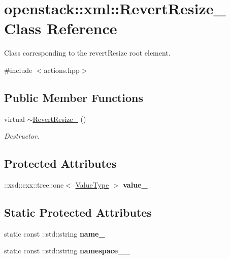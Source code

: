 \hypertarget{classopenstack_1_1xml_1_1RevertResize__}{
\section{openstack::xml::RevertResize\_\- Class Reference}
\label{classopenstack_1_1xml_1_1RevertResize__}
}


Class corresponding to the revertResize root element.  




{\ttfamily \#include $<$actions.hpp$>$}

\subsection*{Public Member Functions}
\begin{DoxyCompactItemize}
\item 
\hypertarget{classopenstack_1_1xml_1_1RevertResize___a110fcedfbab9ec7799ef584b76b26ec1}{
virtual \hyperlink{classopenstack_1_1xml_1_1RevertResize___a110fcedfbab9ec7799ef584b76b26ec1}{$\sim$RevertResize\_\-} ()}
\label{classopenstack_1_1xml_1_1RevertResize___a110fcedfbab9ec7799ef584b76b26ec1}

\begin{DoxyCompactList}\small\item\em Destructor. \item\end{DoxyCompactList}\end{DoxyCompactItemize}
\subsection*{Protected Attributes}
\begin{DoxyCompactItemize}
\item 
\hypertarget{classopenstack_1_1xml_1_1RevertResize___a5c76b4325084c4d3b81f18394c40b663}{
::xsd::cxx::tree::one$<$ \hyperlink{classopenstack_1_1xml_1_1RevertResize}{ValueType} $>$ {\bfseries value\_\-}}
\label{classopenstack_1_1xml_1_1RevertResize___a5c76b4325084c4d3b81f18394c40b663}

\end{DoxyCompactItemize}
\subsection*{Static Protected Attributes}
\begin{DoxyCompactItemize}
\item 
\hypertarget{classopenstack_1_1xml_1_1RevertResize___abc81092a190f95098444b692679f00b8}{
static const ::std::string {\bfseries name\_\-}}
\label{classopenstack_1_1xml_1_1RevertResize___abc81092a190f95098444b692679f00b8}

\item 
\hypertarget{classopenstack_1_1xml_1_1RevertResize___a19e46256361ce93b7438f50b5d13c82a}{
static const ::std::string {\bfseries namespace\_\-\_\-}}
\label{classopenstack_1_1xml_1_1RevertResize___a19e46256361ce93b7438f50b5d13c82a}

\end{DoxyCompactItemize}
